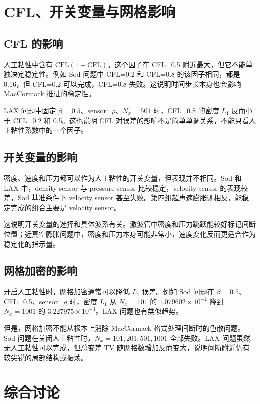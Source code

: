 \documentclass[UTF8,12pt,a4paper]{ctexart}
\begin{document}
\section{CFL、开关变量与网格影响}

\subsection{CFL 的影响}

人工粘性中含有 $\mathrm{CFL}(1-\mathrm{CFL})$。这个因子在 CFL=0.5 附近最大，但它不能单独决定稳定性。例如 Sod 问题中 CFL=0.2 和 CFL=0.8 的该因子相同，都是 0.16，但 CFL=0.2 可以完成，CFL=0.8 失败。这说明时间步长本身也会影响 MacCormack 推进的稳定性。

LAX 问题中固定 $\beta=0.5$、sensor=$\rho$、$N_x=501$ 时，CFL=0.8 的密度 $L_1$ 反而小于 CFL=0.2 和 0.5。这也说明 CFL 对误差的影响不是简单单调关系，不能只看人工粘性系数中的一个因子。

\subsection{开关变量的影响}

密度、速度和压力都可以作为人工粘性的开关变量，但表现并不相同。Sod 和 LAX 中，density sensor 与 pressure sensor 比较稳定，velocity sensor 的表现较差，Sod 基准条件下 velocity sensor 甚至失败。第四组超声速膨胀则相反，能稳定完成的组合主要是 velocity sensor。

这说明开关变量的选择和具体波系有关。激波管中密度和压力跳跃能较好标记间断位置；近真空膨胀问题中，密度和压力本身可能非常小，速度变化反而更适合作为稳定化的指示量。

\subsection{网格加密的影响}

开启人工粘性时，网格加密通常可以降低 $L_1$ 误差。例如 Sod 问题在 $\beta=0.5$、CFL=0.5、sensor=$\rho$ 时，密度 $L_1$ 从 $N_x=101$ 的 $1.079602\times10^{-2}$ 降到 $N_x=1001$ 的 $3.227975\times10^{-3}$。LAX 问题也有类似趋势。

但是，网格加密不能从根本上消除 MacCormack 格式处理间断时的色散问题。Sod 问题在关闭人工粘性时，$N_x=101,201,501,1001$ 全部失败。LAX 问题虽然无人工粘性可以完成，但总变差 TV 随网格数增加反而变大，说明间断附近仍有较尖锐的局部结构或振荡。

\section{综合讨论}
\end{document}
